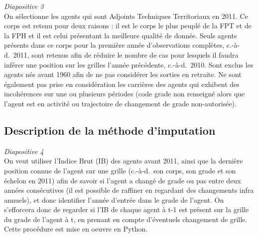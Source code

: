 \documentclass[11pt,a4paper]{article}
\begin{document}
\textit{Diapositive 3}\\

On sélectionne les agents qui sont Adjoints Techniques Territoriaux en 2011. Ce corps est retenu pour deux raisons : il est le corps le plus peuplé de la FPT et de la FPH et il est celui présentant la meilleure qualité de donnée. Seuls agents présents dans ce corps pour la première année d'observations complètes, c.-à-d.~2011, sont retenus afin de réduire le nombre de cas pour lesquels il faudra inférer une position sur les grilles l'année précédente, c.-à-d.~2010. Sont exclus les agents nés avant 1960 afin de ne pas considérer les sorties en retraite. Ne sont également pas prise en considération les carrières des agents qui exhibent des incohérences sur une ou plusieurs périodes (code grade non renseigné alors que l'agent est en activité ou trajectoire de changement de grade non-autorisée).

\subsection{Description de la méthode d'imputation}

\textit{Diapositive 4}\\

On veut utiliser l'Indice Brut (IB) des agents avant 2011, ainsi que la dernière position connue de l'agent sur une grille (c.-à-d.~son corps, son grade et son échelon en 2011) afin de savoir si l'agent a changé de grade ou pas entre deux années consécutives (il est possible de raffiner en regardant des changements infra annuels), et donc identifier l'année d'entrée dans le grade de l'agent.
On s'efforcera donc de regarder si l'IB de chaque agent à t-1 est présent sur la grille du grade de l'agent à t, en prenant en compte d'éventuels changement de grille. Cette procédure est mise en oeuvre en Python.\\
\end{document}
